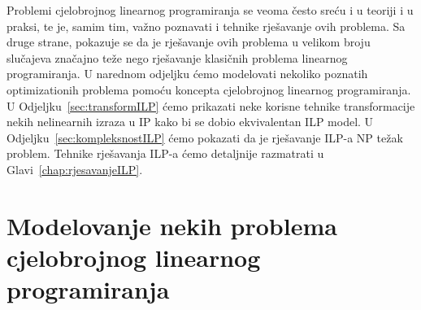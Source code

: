 \documentclass[a4paper, utf8, 11pt, colorlinks]{book}
\theoremstyle{definition}
\begin{document}
Problemi cjelobrojnog linearnog programiranja se veoma često sreću i u teoriji i u praksi, te je, samim tim, važno poznavati i tehnike rješavanje ovih problema. Sa druge strane, pokazuje se da je rješavanje ovih problema u velikom broju slučajeva značajno teže nego rješavanje klasičnih problema linearnog programiranja. U narednom odjeljku ćemo modelovati nekoliko poznatih optimizationih problema pomoću koncepta cjelobrojnog linearnog programiranja. U Odjeljku~\ref{sec:transformILP} ćemo prikazati neke korisne tehnike transformacije nekih nelinearnih izraza u IP kako bi se dobio ekvivalentan ILP model. U Odjeljku~\ref{sec:kompleksnostILP} ćemo pokazati da je rješavanje ILP-a NP težak problem. Tehnike rješavanja ILP-a ćemo detaljnije razmatrati u Glavi~\ref{chap:rjesavanjeILP}.
\section{Modelovanje nekih problema cjelobrojnog linearnog programiranja}
\end{document}
